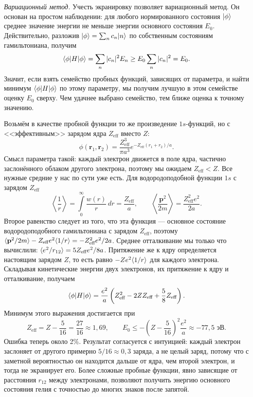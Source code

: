 \textit{Вариационный метод.} Учесть экранировку позволяет вариационный метод.
Он основан на простом наблюдении: для любого нормированного состояния
$\lvert\phi\rangle$ среднее значение энергии не меньше энергии основного состояния
$E_0$. Действительно, разложив $\lvert\phi\rangle = \sum_n c_n\lvert n\rangle$ по собственным
состояниям гамильтониана, получим
\[
  \langle\phi\rvert H\lvert\phi\rangle = \sum_n |c_n|^2E_n \geq E_0\sum_n|c_n|^2 = E_0.
\]
Значит, если взять семейство пробных функций, зависящих от параметра, и найти
минимум $\langle\phi\rvert H\lvert\phi\rangle$ по этому параметру, мы получим лучшую в этом
семействе оценку $E_0$ сверху. Чем удачнее выбрано семейство, тем ближе оценка
к точному значению.

Возьмём в качестве пробной функции то же произведение $1s$-функций, но с
<<эффективным>> зарядом ядра $Z_{\text{eff}}$ вместо $Z$:
\[
  \phi(\mathbf{r}_1, \mathbf{r}_2) = \frac{Z_{\text{eff}}^3}{\pi
    a^3}e^{-Z_{\text{eff}}(r_1 + r_2)/a}.
\]
Смысл параметра такой: каждый электрон движется в поле ядра, частично
заслонённого облаком другого электрона, поэтому мы ожидаем $Z_{\text{eff}} <
  Z$. Все нужные средние у нас по сути уже есть. Для водородоподобной функции
$1s$ с зарядом $Z_{\text{eff}}$
\[
  \left\langle\frac{1}{r}\right\rangle = \int\limits_0^\infty \frac{w(r)}{r}\,dr =
  \frac{Z_{\text{eff}}}{a},\qquad
  \left\langle\frac{\mathbf{p}^2}{2m}\right\rangle = \frac{Z_{\text{eff}}^2e^2}{2a}.
\]
Второе равенство следует из того, что эта функция --- основное состояние
водородоподобного гамильтониана с зарядом $Z_{\text{eff}}$, поэтому
$\langle \mathbf{p}^2/2m \rangle - Z_{\text{eff}}e^2\langle 1/r \rangle =
  -Z_{\text{eff}}^2e^2/2a$. Среднее отталкивание мы только что вычислили:
$\langle e^2/r_{12} \rangle = 5Z_{\text{eff}}e^2/8a$. Притяжение же к ядру определяется
настоящим зарядом $Z$, то есть равно $-Ze^2\langle 1/r \rangle$ для каждого электрона.
Складывая кинетические энергии двух электронов, их притяжение к ядру и
отталкивание, получаем
\[
  \langle\phi\rvert H\lvert\phi\rangle = \frac{e^2}{a}\left(Z_{\text{eff}}^2 - 2ZZ_{\text{eff}}
  + \frac{5}{8}Z_{\text{eff}}\right).
\]
Минимум этого выражения достигается при
\[
  Z_{\text{eff}} = Z - \frac{5}{16} = \frac{27}{16} \approx 1{,}69,\qquad
  E_0 \leq -\left(Z - \frac{5}{16}\right)^2\frac{e^2}{a} \approx -77{,}5\text{~эВ}.
\]
Ошибка теперь около 2\%. Результат согласуется с интуицией: каждый электрон
заслоняет от другого примерно $5/16 \approx 0{,}3$ заряда, а не целый заряд,
потому что с заметной вероятностью он находится дальше от ядра, чем второй
электрон, и тогда не экранирует его. Более сложные пробные функции, явно
зависящие от расстояния $r_{12}$ между электронами, позволяют получить энергию
основного состояния гелия с точностью до многих знаков после запятой.

